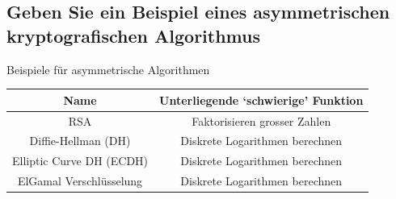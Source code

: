 \subsection*{Geben Sie ein Beispiel eines asymmetrischen kryptografischen Algorithmus}
Beispiele für asymmetrische Algorithmen\\
\begin{tabular}{|c|c|}
    \hline
        Name&Unterliegende `schwierige' Funktion\\
        \hline
        RSA&Faktorisieren grosser Zahlen\\
        Diffie-Hellman (DH)&Diskrete Logarithmen berechnen\\
        Elliptic Curve DH (ECDH) &Diskrete Logarithmen berechnen\\
        ElGamal Verschlüsselung&Diskrete Logarithmen berechnen\\
    \hline
\end{tabular}
